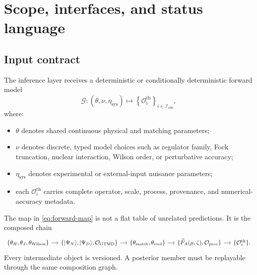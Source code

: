 \documentclass[11pt]{article}
\newcommand{\GTMD}{\ensuremath{\mathrm{GTMD}}}
\newcommand{\cO}{\mathcal O}
\newcommand{\cG}{\mathcal G}
\newcommand{\cI}{\mathcal I}
\newcommand{\thry}{\mathrm{th}}
\newcommand{\sys}{\mathrm{sys}}
\newcommand{\obs}{\mathrm{obs}}
\newcommand{\matchp}{\mathrm{match}}
\newcommand{\evol}{\mathrm{evol}}
\newcommand{\wil}{\mathrm{Wilson}}
\newcommand{\proc}{\mathrm{proc}}
\begin{document}
\begin{abstract}
The result is a fail-closed inference architecture in which uncertainty bands
are pushforwards of common microscopic members, model discrepancy remains
physically attributable, and a failed withheld family produces a traceable
model-revision decision rather than a new curve-specific parameter.
\end{abstract}

\tableofcontents

\section{Scope, interfaces, and status language}
\label{sec:scope}

\subsection{Input contract}

The inference layer receives a deterministic or conditionally deterministic
forward model
\begin{equation}
 \cG:
 (\theta,\nu,\eta_{\sys})
 \longmapsto
 \left\{
 \cO_i^{\thry}
 \right\}_{i\in\cI_{\obs}},
 \label{eq:forward-map}
\end{equation}
where:
\begin{itemize}
\item \(\theta\) denotes shared continuous physical and matching parameters;
\item \(\nu\) denotes discrete, typed model choices such as regulator family,
      Fock truncation, nuclear interaction, Wilson order, or perturbative
      accuracy;
\item \(\eta_{\sys}\) denotes experimental or external-input nuisance
      parameters;
\item each \(\cO_i^{\thry}\) carries complete operator, scale, process,
      provenance, and numerical-accuracy metadata.
\end{itemize}
The map in \cref{eq:forward-map} is not a flat table of unrelated predictions.
It is the composed chain
\begin{equation}
 \begin{tikzcd}[column sep=small]
 \{\theta_H,\theta_J,\theta_{\wil}\}
 \arrow[r]
 & \{|\Psi_N\rangle,|\Psi_D\rangle,\cO_{\GTMD}\}
 \arrow[r]
 & \{\theta_{\matchp},\theta_{\evol}\}
 \arrow[r]
 & \{\widetilde F_A(\mu,\zeta),\cO_{\proc}\}
 \arrow[r]
 & \{\cO_i^{\thry}\}.
 \end{tikzcd}
 \label{eq:generative-inference-chain}
\end{equation}
Every intermediate object is versioned.  A posterior member must be replayable
through the same composition graph.
\end{document}
